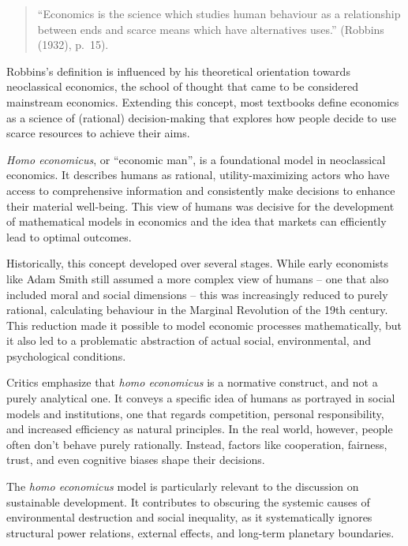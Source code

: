 \documentclass[
  a4paper,
  openany]{book}
\begin{document}
\begin{quote}
``Economics is the science which studies human behaviour as a
relationship between ends and scarce means which have alternatives
uses.'' (Robbins (1932), p.~15).
\end{quote}

Robbins's definition is influenced by his theoretical orientation
towards neoclassical economics, the school of thought that came to be
considered mainstream economics. Extending this concept, most textbooks
define economics as a science of (rational) decision-making that
explores how people decide to use scarce resources to achieve their
aims.

\begin{tcolorbox}[enhanced jigsaw, coltitle=black, bottomtitle=1mm, opacitybacktitle=0.6, titlerule=0mm, opacityback=0, leftrule=.75mm, colbacktitle=quarto-callout-note-color!10!white, bottomrule=.15mm, toptitle=1mm, breakable, title={Homo economicus as the foundational model of human behaviour}, arc=.35mm, rightrule=.15mm, toprule=.15mm, left=2mm, colback=white, colframe=quarto-callout-note-color-frame]

\emph{Homo economicus}, or ``economic man'', is a foundational model in
neoclassical economics. It describes humans as rational,
utility-maximizing actors who have access to comprehensive information
and consistently make decisions to enhance their material well-being.
This view of humans was decisive for the development of mathematical
models in economics and the idea that markets can efficiently lead to
optimal outcomes.

Historically, this concept developed over several stages. While early
economists like Adam Smith still assumed a more complex view of humans
-- one that also included moral and social dimensions -- this was
increasingly reduced to purely rational, calculating behaviour in the
Marginal Revolution of the 19th century. This reduction made it possible
to model economic processes mathematically, but it also led to a
problematic abstraction of actual social, environmental, and
psychological conditions.

Critics emphasize that \emph{homo economicus} is a normative construct,
and not a purely analytical one. It conveys a specific idea of humans as
portrayed in social models and institutions, one that regards
competition, personal responsibility, and increased efficiency as
natural principles. In the real world, however, people often don't
behave purely rationally. Instead, factors like cooperation, fairness,
trust, and even cognitive biases shape their decisions.

The \emph{homo economicus} model is particularly relevant to the
discussion on sustainable development. It contributes to obscuring the
systemic causes of environmental destruction and social inequality, as
it systematically ignores structural power relations, external effects,
and long-term planetary boundaries.

\end{tcolorbox}
\end{document}
